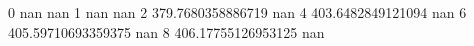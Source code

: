 0 nan nan
1 nan nan
2 379.7680358886719 nan
4 403.6482849121094 nan
6 405.59710693359375 nan
8 406.17755126953125 nan
